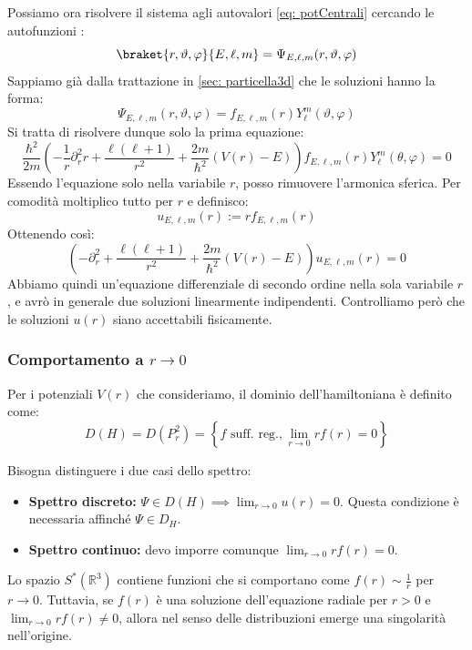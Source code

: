 Possiamo ora risolvere il sistema agli autovalori \ref{eq: potCentrali} cercando le autofunzioni : \[\braket{r,\vartheta, \varphi}{E, \ell, m}= \Psi_{E, \ell, m}(r, \vartheta, \varphi)\]
Sappiamo già dalla trattazione in \ref{sec: particella3d} che le soluzioni hanno la forma:
\begin{equation}
    \Psi_{E, \ell, m}(r, \vartheta, \varphi)= f_{E,\ell,m}(r)Y^m_\ell(\vartheta,\varphi)
\end{equation}
Si tratta di risolvere dunque solo la prima equazione:
\begin{equation}
    \frac{\hbar^2}{2m} \left( -\frac{1}{r} \partial_r^2 r + \frac{\ell(\ell+1)}{r^2} + \frac{2m}{\hbar^2}(V(r)-E) \right) f_{E,\ell,m}(r) Y_\ell^m(\theta, \varphi) = 0
\end{equation}
Essendo l'equazione solo nella variabile \(r\), posso rimuovere l'armonica sferica. Per comodità moltiplico tutto per \(r\) e definisco:
\begin{equation}
    u_{E,\ell,m}(r) := r f_{E,\ell,m}(r)
\end{equation}
Ottenendo così:
\begin{equation}
    \left( -\partial_r^2 + \frac{\ell(\ell+1)}{r^2} + \frac{2m}{\hbar^2}(V(r)-E) \right) u_{E,\ell,m}(r) = 0
\end{equation}
Abbiamo quindi un'equazione differenziale di secondo ordine nella sola variabile \(r\), e avrò in generale due soluzioni linearmente indipendenti. 
Controlliamo però che le soluzioni \(u(r)\) siano accettabili fisicamente.

\subsubsection{Comportamento a \(r\to 0\)}

Per i potenziali \( V(r) \) che consideriamo, il dominio dell'hamiltoniana è definito come:
\[
D(H) = D(P_r^2) = \left\{ f \text{ suff. reg.}, \lim_{r\to 0} r f(r) = 0 \right\}
\]

Bisogna distinguere i due casi dello spettro:
\begin{itemize}
    \item \textbf{Spettro discreto:} \( \Psi \in D(H) \implies \lim_{r\to 0} u(r) = 0 \). Questa condizione è necessaria affinché \( \Psi \in D_H \).
    \item \textbf{Spettro continuo:} devo imporre comunque \( \lim_{r\to 0} r f(r) = 0 \).
\end{itemize}

Lo spazio \( S^*(\mathbb{R}^3) \) contiene funzioni che si comportano come \( f(r) \sim \frac{1}{r} \) per \( r \to 0 \).
Tuttavia, se \( f(r) \) è una soluzione dell'equazione radiale per \( r > 0 \) e \( \lim_{r\to 0} r f(r) \neq 0 \), allora nel senso delle distribuzioni emerge una singolarità nell'origine.

